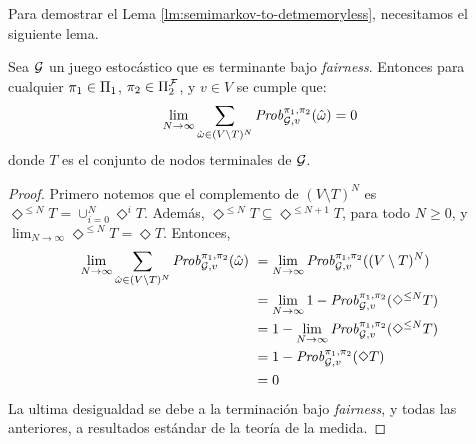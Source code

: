 \iffalse
Para demostrar el Lema \ref{lm:semimarkov-to-detmemoryless},  necesitamos el siguiente lema.



\begin{lemma}\label{lm:sum-of-nonterminal-is-zero}
  Sea $\mathcal{G}$ un juego estocástico que es terminante bajo \textit{fairness}.
  Entonces para cualquier $\pi_{1} \in \Pi_{1}$,
  $\pi_{2} \in \Pi^{\mathcal{F}}_{2}$, y $v \in V$ se cumple que:
  \[
  \lim_{N \to \infty} \sum_{\hat{\omega} \in (V \setminus T)^N} \mathit{Prob}^{\pi_{1}, \pi_{2}}_{\mathcal{G},v}(\hat{\omega}) = 0
  \]
  donde $T$ es el conjunto de nodos terminales de $\mathcal{G}$.
\end{lemma}
%
\begin{proof}
  Primero notemos que el complemento de $(V \setminus T)^N$ es
  $\Diamond^{\leq N} T = \cup^N_{i=0} \Diamond^i T$.
  Además, $\Diamond^{\leq N} T \subseteq \Diamond^{\leq N+1} T$, para todo $N\geq 0$,
  y $\lim_{N \to \infty} \Diamond^{\leq N} T = \Diamond T$.
  Entonces,
  \begin{align*}
    \lim_{N \to \infty} \sum_{\hat{\omega} \in (V \setminus T)^N} \mathit{Prob}^{\pi_{1}, \pi_{2}}_{\mathcal{G},v}(\hat{\omega}) \
    & = \lim_{N \to \infty} \mathit{Prob}^{\pi_{1}, \pi_{2}}_{\mathcal{G},v}((V \setminus T)^N) \\
    & = \lim_{N \to \infty} 1 - \mathit{Prob}^{\pi_{1}, \pi_{2}}_{\mathcal{G},v}(\Diamond^{\leq N} T ) \\
    & = 1 - \lim_{N \to \infty} \mathit{Prob}^{\pi_{1}, \pi_{2}}_{\mathcal{G},v}(\Diamond^{\leq N} T ) \\
    & = 1 - \mathit{Prob}^{\pi_{1}, \pi_{2}}_{\mathcal{G},v}(\Diamond T ) \\
    & = 0
  \end{align*}
  La ultima desigualdad se debe a la terminación bajo \textit{fairness}, y todas las anteriores, a resultados estándar de la teoría de la medida.

\end{proof}
